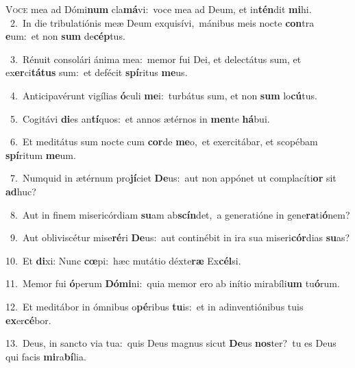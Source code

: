\lettrine{\initial\textcolor{\initialcolor}{V}}{oce} mea ad Dómi\textbf{num} cla\-\textbf{má}\-vi:~\star voce mea ad Deum, et in\-\textbf{tén}\-dit \textbf{mi}\-hi.\\
{\numbfont\textcolor{\numbcolor}{~2.}}~In die tribulatiónis meæ Deum exquisívi,~\dagger mánibus meis nocte \textbf{con}\-tra \textbf{e}\-um:~\star et non \textbf{sum} de\-\textbf{cép}\-tus.\par
{\numbfont\textcolor{\numbcolor}{~3.}}~Rénuit consolári ánima mea:~\dagger memor fui Dei, et delectátus sum, et ex\-\textbf{er}\-ci\-\textbf{tá}\-\textbf{tus} sum:~\star et defécit \textbf{spí}\-ritus \textbf{me}\-us.\par
{\numbfont\textcolor{\numbcolor}{~4.}}~Anticipavérunt vigílias \textbf{ó}\-culi \textbf{me}\-i:~\star turbátus sum, et non \textbf{sum} lo\-\textbf{cú}\-tus.\par
{\numbfont\textcolor{\numbcolor}{~5.}}~Cogitávi \textbf{di}\-es an\-\textbf{tí}\-quos:~\star et annos ætérnos in \textbf{men}\-te \textbf{há}\-bui.\par
{\numbfont\textcolor{\numbcolor}{~6.}}~Et meditátus sum nocte cum \textbf{cor}\-de \textbf{me}\-o,~\star et exercitábar, et scopébam \textbf{spí}\-ritum \textbf{me}\-um.\par
{\numbfont\textcolor{\numbcolor}{~7.}}~Numquid in ætérnum pro\-\textbf{jí}\-ciet \textbf{De}\-us:~\star aut non appónet ut complacíti\textbf{or} sit \textbf{ad}\-huc?\par
{\numbfont\textcolor{\numbcolor}{~8.}}~Aut in finem misericórdiam \textbf{su}\-am ab\-\textbf{scín}\-det,~\star a generatióne in gene\-\textbf{ra}\-ti\-\textbf{ó}\-nem?\par
{\numbfont\textcolor{\numbcolor}{~9.}}~Aut obliviscétur mise\-\textbf{ré}\-ri \textbf{De}\-us:~\star aut continébit in ira sua miseri\-\textbf{cór}\-dias \textbf{su}\-as?\par
{\numbfont\textcolor{\numbcolor}{10.}}~Et \textbf{di}\-xi: Nunc \textbf{cœ}\-pi:~\star hæc mutátio déxte\textbf{ræ} Ex\-\textbf{cél}\-si.\par
{\numbfont\textcolor{\numbcolor}{11.}}~Memor fui \textbf{ó}\-perum \textbf{Dó}\-\textbf{mi}ni:~\star quia memor ero ab inítio mirabíli\textbf{um} tu\-\textbf{ó}\-rum.\par
{\numbfont\textcolor{\numbcolor}{12.}}~Et meditábor in ómnibus o\-\textbf{pé}\-ribus \textbf{tu}\-is:~\star et in adinventiónibus tuis \textbf{ex}\-er\-\textbf{cé}\-bor.\par
{\numbfont\textcolor{\numbcolor}{13.}}~Deus, in sancto via tua:~\dagger quis Deus magnus sicut \textbf{De}\-us \textbf{nos}\-ter?~\star tu es Deus qui facis \textbf{mi}\-ra\-\textbf{bí}\-lia.\par
